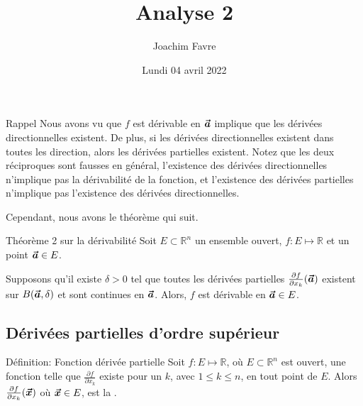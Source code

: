 \documentclass[a4paper]{article}
\title{Analyse 2}
\author{Joachim Favre}
\date{Lundi 04 avril 2022}
\begin{document}
\maketitle


\begin{parag}{Rappel}
    Nous avons vu que $f$ est dérivable en $\bm{\protect\vec{a}}$ implique que les dérivées directionnelles existent. De plus, si les dérivées directionnelles existent dans toutes les direction, alors les dérivées partielles existent. Notez que les deux réciproques sont fausses en général, l'existence des dérivées directionnelles n'implique pas la dérivabilité de la fonction, et l'existence des dérivées partielles n'implique pas l'existence des dérivées directionnelles.

    Cependant, nous avons le théorème qui suit.
\end{parag}

\begin{parag}{Théorème 2 sur la dérivabilité}
    Soit $E \subset \mathbb{R}^n$ un ensemble ouvert, $f : E \mapsto \mathbb{R}$ et un point $\bm{\protect\vec{a}} \in E$.

    Supposons qu'il existe $\delta > 0$ tel que toutes les dérivées partielles $\frac{\partial f}{\partial x_k}\left(\bvec{a}\right)$ existent sur $B\left(\bvec{a}, \delta\right)$ et sont continues en $\bm{\protect\vec{a}}$. Alors, $f$ est dérivable en $\bm{\protect\vec{a}}\in E$.
\end{parag}

\subsection{Dérivées partielles d'ordre supérieur}
\begin{parag}{Définition: Fonction dérivée partielle}
    Soit $f: E \mapsto \mathbb{R}$, où $E \subset \mathbb{R}^n$ est ouvert, une fonction telle que $\frac{\partial f}{\partial x_k}$ existe pour un $k$, avec $1 \leq k \leq n$, en tout point de $E$. Alors $\frac{\partial f}{\partial x_k}\left(\bvec{x}\right)$ où $\bm{\protect\vec{x}} \in E$, est la .
\end{parag}
\end{document}
